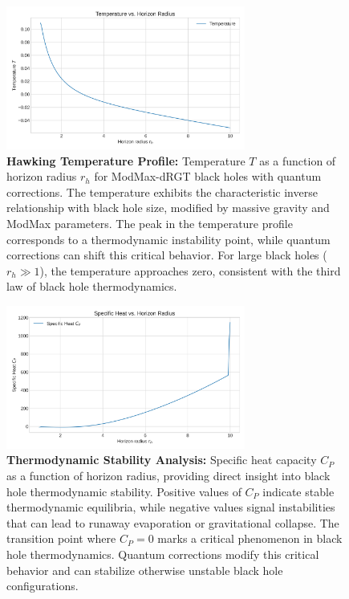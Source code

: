 \documentclass[superscriptaddress, prd, aps,amsmath,amssymb,showpacs,showkeys, onecolumn]{revtex4-2}
\begin{document}
\begin{figure}[H]
    \centering
    \includegraphics[width=0.7\textwidth]{figures/temperature_vs_rh.png}
    \caption{\textbf{Hawking Temperature Profile:} Temperature $T$ as a function of horizon radius $r_h$ for ModMax-dRGT black holes with quantum corrections. The temperature exhibits the characteristic inverse relationship with black hole size, modified by massive gravity and ModMax parameters. The peak in the temperature profile corresponds to a thermodynamic instability point, while quantum corrections can shift this critical behavior. For large black holes ($r_h \gg 1$), the temperature approaches zero, consistent with the third law of black hole thermodynamics.}
    \label{fig:temperature_vs_rh}
\end{figure}

\begin{figure}[H]
    \centering
    \includegraphics[width=0.7\textwidth]{figures/specific_heat_vs_rh.png}
    \caption{\textbf{Thermodynamic Stability Analysis:} Specific heat capacity $C_P$ as a function of horizon radius, providing direct insight into black hole thermodynamic stability. Positive values of $C_P$ indicate stable thermodynamic equilibria, while negative values signal instabilities that can lead to runaway evaporation or gravitational collapse. The transition point where $C_P = 0$ marks a critical phenomenon in black hole thermodynamics. Quantum corrections modify this critical behavior and can stabilize otherwise unstable black hole configurations.}
    \label{fig:specific_heat_vs_rh}
\end{figure}
\end{document}
